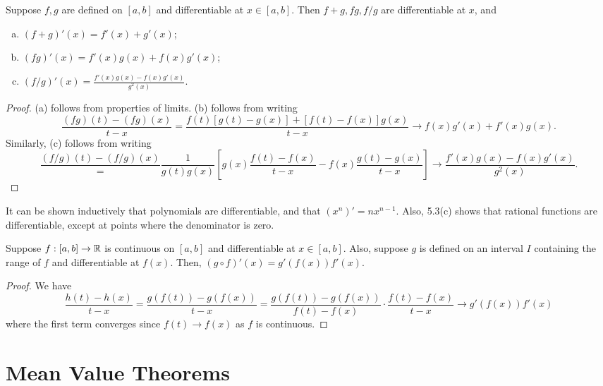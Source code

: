 \begin{theorem} %
    Suppose $f, g$ are defined on $[a, b]$ and differentiable at $x \in [a, b]$. Then $f + g, fg, f / g$ are differentiable at $x$, and
    \begin{enumerate}[(a)]
        \item $(f + g)'(x) = f'(x) + g'(x)$;
        \item $(fg)'(x) = f'(x) g(x) + f(x) g'(x)$;
        \item $(f/g)'(x) = \frac{f'(x) g(x) - f(x) g'(x)} {g^2(x)}$.
    \end{enumerate}
    
    \begin{proof}
        (a) follows from properties of limits. (b) follows from writing
        \[
            \frac{(fg)(t) - (fg)(x)}{t - x} = \frac{f(t) [g(t) - g(x)] + [f(t) - f(x)] g(x)}{t - x} \to f(x) g'(x) + f'(x) g(x).
        \]
        Similarly, (c) follows from writing
        \[
            \frac{(f/g)(t) - (f/g)(x)} = \frac{1}{g(t) g(x)} \left[g(x) \frac{f(t) - f(x)}{t - x} - f(x) \frac{g(t) - g(x)}{t - x} \right] \to \frac{f'(x) g(x) - f(x) g'(x)} {g^2(x)}.
        \]
    \end{proof}
\end{theorem}

It can be shown inductively that polynomials are differentiable, and that $(x^n)' = nx^{n-1}$. Also, 5.3(c) shows that rational functions are differentiable, except at points where the denominator is zero.

\begin{theorem} %
    Suppose $f: [a, b] \rightarrow \mathbb{R}$ is continuous on $[a, b]$ and differentiable at $x \in [a, b]$. Also, suppose $g$ is defined on an interval $I$ containing the range of $f$ and differentiable at $f(x)$. Then, $(g \circ f)'(x) = g'(f(x)) f'(x)$.
    
    \begin{proof}
        We have
        \[
            \frac{h(t) - h(x)}{t - x} = \frac{g(f(t)) - g(f(x))}{t - x} = \frac{g(f(t)) - g(f(x))}{f(t) - f(x)} \cdot \frac{f(t) - f(x)}{t - x} \to g'(f(x)) f'(x)
        \]
        where the first term converges since $f(t) \to f(x)$ as $f$ is continuous. 
    \end{proof}
\end{theorem}

\section{Mean Value Theorems}

